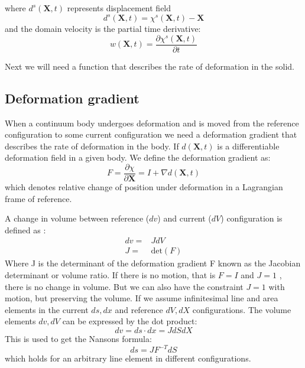where $d^s(\textbf{X} ,t)$ represents displacement field
\begin{equation}
 d^s(\textbf{X},t) = \chi^s(\textbf{X},t) -\textbf{X}   
\end{equation}
and the domain velocity is the partial time derivative: 
\begin{equation}
 w(\textbf{X},t) = \frac{\partial \chi^s(\textbf{X},t)}{\partial t}   
\end{equation}

Next we will need a function that describes the rate of deformation in the solid.
\subsection*{Deformation gradient}
When a continuum body undergoes deformation and is moved from the reference configuration to some current configuration we need a deformation gradient that describes the rate of deformation in the body. 
If $d(\textbf{X},t)$ is a differentiable deformation field in a given body. We define the deformation gradient as:  
\begin{equation}
\label{eq:deformation_gradient}
F = \frac{\partial \chi}{\partial \textbf{X}} = I + \nabla d(\textbf{X},t) 
\end{equation}
which denotes relative change of position under deformation in a Lagrangian frame of reference.  

A change in volume between reference ($dv$) and current ($dV$) configuration is defined as :
\begin{align}
\label{eq:det_F}
dv =& J dV\\
J =& \text{det}(F)
\end{align}
Where J is the determinant of the deformation gradient F known as the Jacobian determinant or volume ratio. If there is no motion, that is $ F = I$ and $J=1$ , there is no change in volume. But we can also have the constraint $J=1$ with motion, but preserving the volume.
If we assume infinitesimal line and area elements in the current $ds, dx$ and reference $dV,dX$ configurations. The volume elements $dv, dV$ can be expressed by the dot product:
\begin{equation}
 dv = ds\cdot dx = J dS dX
\end{equation}
This is used to get the Nansons formula:
\begin{equation}\label{eq:Nanson}
ds = JF^{-T}dS
\end{equation}
which holds for an arbitrary line element in different configurations.

